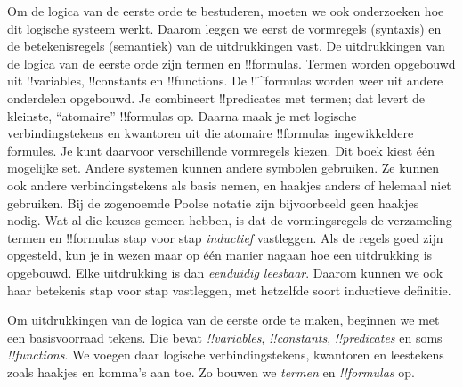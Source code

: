 \documentclass[openany]{memoir}
\begin{document}
Om de logica van de eerste orde te bestuderen, moeten we ook
onderzoeken hoe dit logische systeem werkt. Daarom leggen we eerst de
vormregels (syntaxis) en de betekenisregels (semantiek) van de
uitdrukkingen vast. De uitdrukkingen van de logica van de eerste orde
zijn termen en !!{formula}s. Termen worden opgebouwd uit
!!{variable}s, !!{constant}s en !!{function}s.
De !!^{formula}s worden weer uit andere onderdelen opgebouwd. Je
combineert !!{predicate}s met termen; dat levert de kleinste,
``atomaire'' !!{formula}s op. Daarna maak je met logische
verbindingstekens en kwantoren uit die atomaire !!{formula}s
ingewikkeldere formules.
Je kunt daarvoor verschillende vormregels kiezen. Dit boek kiest één
mogelijke set. Andere systemen kunnen andere symbolen gebruiken. Ze
kunnen ook andere verbindingstekens als basis nemen, en haakjes anders
of helemaal niet gebruiken. Bij de zogenoemde Poolse notatie zijn
bijvoorbeeld geen haakjes nodig.
Wat al die keuzes gemeen hebben, is dat de vormingsregels de
verzameling termen en !!{formula}s stap voor stap \emph{inductief}
vastleggen. Als de regels goed zijn opgesteld, kun je in wezen maar op
één manier nagaan hoe een uitdrukking is opgebouwd. Elke uitdrukking is
dan \emph{eenduidig leesbaar}. Daarom kunnen we ook haar betekenis stap
voor stap vastleggen, met hetzelfde soort inductieve definitie.
\endgroup

\begingroup
\def\olfilename{OLP-0151}
\def\olfilepath{content/first-order-logic/syntax-and-semantics/}
\hypertarget{unit-OLP-0151}{}






Om uitdrukkingen van de logica van de eerste orde te maken, beginnen we
met een basisvoorraad tekens. Die bevat \emph{!!{variable}s},
\emph{!!{constant}s}, \emph{!!{predicate}s} en soms
\emph{!!{function}s}. We voegen daar logische verbindingstekens,
kwantoren en leestekens zoals haakjes en komma's aan toe. Zo bouwen we
\emph{termen} en \emph{!!{formula}s} op.
\end{document}
